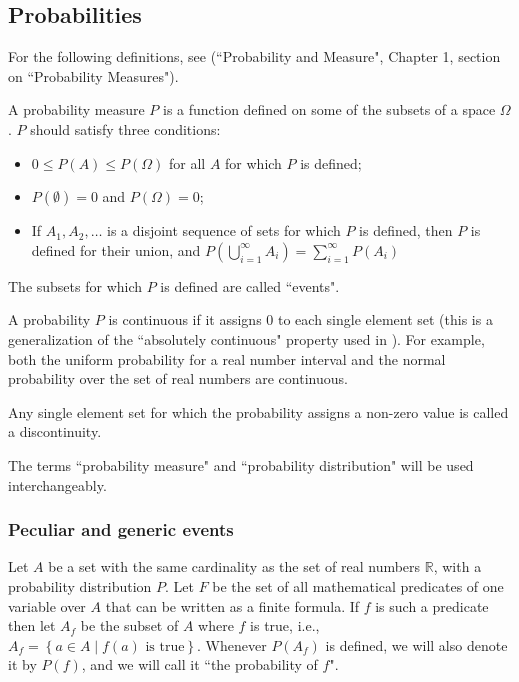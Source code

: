 \documentclass[a4paper
,draft
]{article}
\def\reale{\mathbb{R}}
\newcommand{\multime}[1]{\left\{ #1 \right\}}
\newcommand{\ghilimele}[1]{``#1"}
\begin{document}
\subsection{Probabilities}
\label{sec:probabilities}

For the following definitions, see
\textcite{Billingsley1995} (\ghilimele{Probability and Measure}, Chapter 1, section on \ghilimele{Probability Measures}).

A probability measure $P$ is a function defined on some of the subsets of a
space $\Omega$. $P$ should satisfy three conditions:
\begin{itemize}
  \item $0 \le P(A) \le P(\Omega)$ for all $A$ for which $P$ is defined;
  \item $P(\emptyset) = 0$ and $P(\Omega) = 0$;
  \item If $A_1, A_2, \dots$ is a disjoint sequence of sets for which $P$ is
        defined, then $P$ is defined for their union, and
        $P(\bigcup\limits_{i=1}^{\infty} A_i)=\sum_{i=1}^{\infty}P(A_i)$
\end{itemize}

The subsets for which $P$ is defined are called \ghilimele{events}.


A probability $P$ is continuous if it assigns $0$ to each single element set
(this is a generalization of the \ghilimele{absolutely continuous} property
used in \textcite{Billingsley1995}).
For example, both the uniform probability for a real number interval and the
normal probability over the set of real numbers are continuous.

Any single element set for which the probability assigns a non-zero value is
called a discontinuity.

The terms \ghilimele{probability measure} and
\ghilimele{probability distribution} will be used interchangeably.

\subsubsection{Peculiar and generic events}

Let $A$ be a set with the same cardinality as the set of real numbers $\reale$,
with a probability distribution $P$.
Let $F$ be the set of
all mathematical predicates of one variable over $A$ that can be written as a
finite formula.
If $f$ is such a predicate then let $A_f$ be the subset of
$A$ where $f$ is true, i.e., $A_f=\multime{a\in A\mid f(a) \mbox{ is true}}$.
Whenever $P(A_f)$ is defined, we will also denote it by $P(f)$, and we will
call it \ghilimele{the probability of $f$}.
\end{document}
